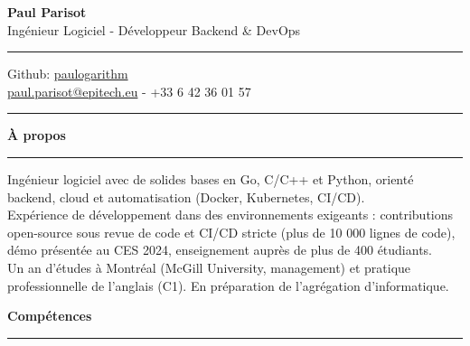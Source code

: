 \documentclass[9pt]{extarticle}
\begin{document}
\begin{center}
	{\huge\bfseries Paul Parisot}
	\\[9pt]
	{\Large Ingénieur Logiciel - Développeur Backend \& DevOps}
	\\
\end{center}


\par\vspace{-5pt}
\rule{\linewidth}{0.4pt}
\par\vspace{-5pt}

\begin{center}
	Github: \href{https://github.com/paulogarithm}{paulogarithm}
	\\
	\href{mailto:paul.parisot@epitech.eu}{paul.parisot@epitech.eu} - +33 6 42 36 01 57
	\\
\end{center}

\par\vspace{-10pt}
\rule{\linewidth}{0.4pt}
\par\vspace{7pt}


{\large\bfseries À propos}
\par\vspace{-8pt}
\rule{\linewidth}{0.4pt}
\par\vspace{5pt}

Ingénieur logiciel avec de solides bases en Go, C/C++ et Python, orienté backend, cloud et automatisation (Docker, Kubernetes, CI/CD).
\\
Expérience de développement dans des environnements exigeants : contributions open-source sous revue de code et CI/CD stricte (plus de 10 000 lignes de code), démo présentée au CES 2024, enseignement auprès de plus de 400 étudiants.
\\
Un an d'études à Montréal (McGill University, management) et pratique professionnelle de l'anglais (C1). En préparation de l'agrégation d'informatique.
\par\vspace{5pt}


{\large\bfseries Compétences}
\par\vspace{-8pt}
\rule{\linewidth}{0.4pt}
\par\vspace{5pt}
\end{document}
